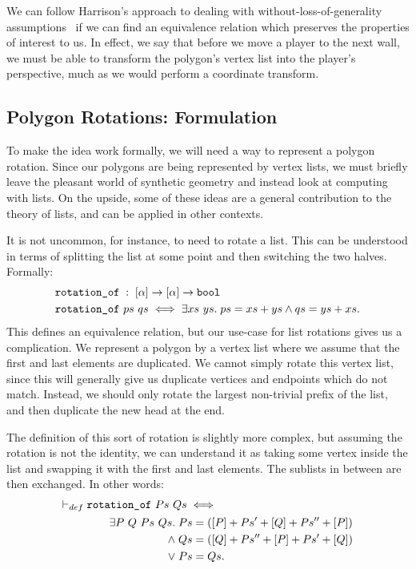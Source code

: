 We can follow Harrison's approach to dealing with without-loss-of-generality assumptions~\cite{HarrisonWLOG} if we can find an equivalence relation which preserves the properties of interest to us. In effect, we say that before we move a player to the next wall, we must be able to transform the polygon's vertex list into the player's perspective, much as we would perform a coordinate transform.

\subsection{Polygon Rotations: Formulation}\label{sec:PolygonRotation}
To make the idea work formally, we will need a way to represent a polygon rotation. Since our polygons are being represented by vertex lists, we must briefly leave the pleasant world of synthetic geometry and instead look at computing with lists. On the upside, some of these ideas are a general contribution to the theory of lists, and can be applied in other contexts. 

It is not uncommon, for instance, to need to rotate a list. This can be understood in terms of splitting the list at some point and then switching the two halves. Formally:
\begin{displaymath}
  \begin{split}
&\texttt{rotation\_of}\; :\; [\alpha] \rightarrow [\alpha] \rightarrow \texttt{bool}\\
&\texttt{rotation\_of}\ ps\ qs \iff \exists xs\ ys.\; ps = xs + ys \wedge qs = ys + xs.\\
  \end{split}
\end{displaymath}
This defines an equivalence relation, but our use-case for list rotations gives us a complication. We represent a polygon by a vertex list where we assume that the first and last elements are duplicated. We cannot simply rotate this vertex list, since this will generally give us duplicate vertices and endpoints which do not match. Instead, we should only rotate the largest non-trivial prefix of the list, and then duplicate the new head at the end. 

The definition of this sort of rotation is slightly more complex, but assuming the rotation is not the identity, we can understand it as taking some vertex inside the list and swapping it with the first and last elements. The sublists in between are then exchanged. In other words:
\begin{align*}
    \vdash_{def}\;&\texttt{rotation\_of}\ Ps\ Qs \iff\\
    &\qquad\begin{aligned}
    \exists P\ Q\ Ps\ Qs.\; Ps &= ([P] + Ps' + [Q] + Ps'' + [P])\\
    \wedge\; Qs &= ([Q] + Ps'' + [P] + Ps' + [Q])\\
    \vee\; Ps &= Qs.
  \end{aligned}
\end{align*}

